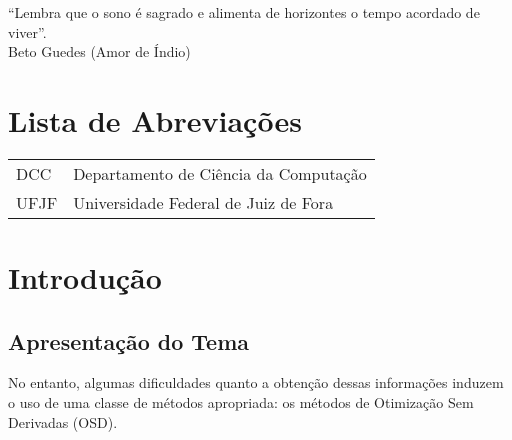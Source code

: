 \documentclass[a4paper,12pt]{monografia}
\theoremstyle{plain}
\theoremstyle{definition}
\theoremstyle{remark}
\begin{document}
%
%


\begin{epigrafe}
``Lembra que o sono é sagrado e alimenta de horizontes o tempo acordado de viver''.\\
\hfill Beto Guedes (Amor de Índio)
\end{epigrafe}



 \tableofcontents \thispagestyle{empty} \listoffigures
\thispagestyle{empty} \listoftables \thispagestyle{empty}



\chapter*{Lista de Abreviações} 
\doublespacing  \begin{tabular}{l l}

DCC & Departamento de Ciência da Computação \\
UFJF & Universidade Federal de Juiz de Fora \\

\end{tabular}  \thispagestyle{empty}




%
%
%
\pagestyle{ruledheader}
\chapter{Introdução}
\section{Apresentação do Tema} %
No entanto, algumas dificuldades quanto a obtenção dessas informações induzem o uso de uma classe de métodos apropriada:
os métodos de Otimização Sem Derivadas (OSD).
\end{document}
